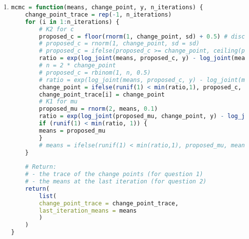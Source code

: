 \documentclass{article}
\begin{document}
\begin{enumerate}
\item 
\begin{lstlisting}[language=R]
mcmc = function(means, change_point, y, n_iterations) {
    change_point_trace = rep(-1, n_iterations)
    for (i in 1:n_iterations) {
        # K2 for c
        proposed_c = floor(rnorm(1, change_point, sd) + 0.5) # discrete normal proposal
        # proposed_c = rnorm(1, change_point, sd = sd)
        # proposed_c = ifelse(proposed_c >= change_point, ceiling(proposed_c), floor(proposed_c)) # proposal
        ratio = exp(log_joint(means, proposed_c, y) - log_joint(means, change_point, y)) # M-H ratio
        # n = 2 * change_point
        # proposed_c = rbinom(1, n, 0.5)
        # ratio = exp(log_joint(means, proposed_c, y) - log_joint(means, change_point, y) + dbinom(proposed_c, n, 0.5, log=TRUE) - dbinom(change_point, n, 0.5, log=TRUE)) # M-H ratio
        change_point = ifelse(runif(1) < min(ratio,1), proposed_c, change_point) # acceptance
        change_point_trace[i] = change_point
        # K1 for mu
        proposed_mu = rnorm(2, means, 0.1)
        ratio = exp(log_joint(proposed_mu, change_point, y) - log_joint(means, change_point, y))
        if (runif(1) < min(ratio, 1)) {
        means = proposed_mu
        }
        # means = ifelse(runif(1) < min(ratio,1), proposed_mu, means) # !!! VERY ANNOYING BUG
    }
    
    # Return:
    # - the trace of the change points (for question 1) 
    # - the means at the last iteration (for question 2)
    return(
        list(
        change_point_trace = change_point_trace, 
        last_iteration_means = means 
        )
    )
}
\end{lstlisting}



\end{enumerate}
\end{document}
